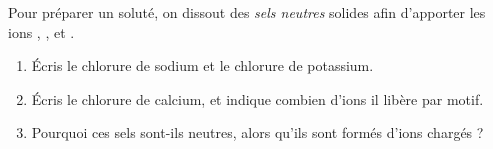 \documentclass[11pt,a4paper]{article}
\begin{document}
\begin{exo}
Pour préparer un soluté, on dissout des \emph{sels neutres} solides afin d'apporter les ions ,
,  et .
\begin{enumerate}[label=\alph*)]
  \item Écris le chlorure de sodium et le chlorure de potassium.
  \item Écris le chlorure de calcium, et indique combien d'ions  il libère par motif.
  \item Pourquoi ces sels sont-ils neutres, alors qu'ils sont formés d'ions chargés ?
\end{enumerate}
\end{exo}
\end{document}
